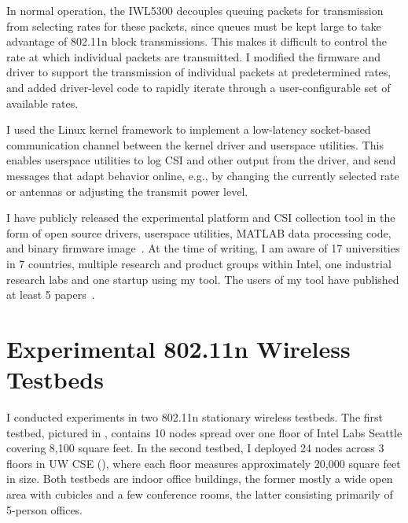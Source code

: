  In normal operation, the IWL5300 decouples queuing packets for transmission from selecting rates for these packets, since queues must be kept large to take advantage of 802.11n block transmissions. This makes it difficult to control the rate at which individual packets are transmitted. I modified the firmware and driver to support the transmission of individual packets at predetermined rates, and added driver-level code to rapidly iterate through a user-configurable set of available rates.

 I used the Linux kernel  framework to implement a low-latency socket-based communication channel between the kernel driver and userspace utilities. This enables userspace utilities to log CSI and other output from the driver, and send messages that adapt behavior online, e.g., by changing the currently selected rate or antennas or adjusting the transmit power level.

 I have publicly released the experimental platform and CSI collection tool in the form of open source drivers, userspace utilities, MATLAB data processing code, and binary firmware image~\cite{Halperin_csitool}. At the time of writing, I am aware of 17 universities in 7 countries, multiple research and product groups within Intel, one industrial research labs and one startup using my tool. The users of my tool have published at least 5 papers~\cite{Bhartia_FreqDiv,Crepaldi_CSI_SF,Perahia_Doppler,Sen_SpinLoc,Sen_PinLoc}.

\section{Experimental 802.11n Wireless Testbeds}
I conducted experiments in two 802.11n stationary wireless testbeds. The first testbed, pictured in , contains 10 nodes spread over one floor of Intel Labs Seattle covering 8,100 square feet. In the second testbed, I deployed 24 nodes across 3 floors in UW CSE (), where each floor measures approximately 20,000 square feet in size. Both testbeds are indoor office buildings, the former mostly a wide open area with cubicles and a few conference rooms, the latter consisting primarily of 5-person offices.

